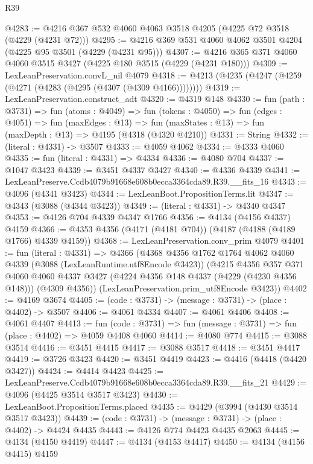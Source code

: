 \begin{lexlean}{R39}
\begin{coremodule}
@4283 := @4216 @367 @532 @4060 @4063 @3518 @4205 (@4225 @72 @3518 (@4229 (@4231 @72)))
@4295 := @4216 @369 @531 @4060 @4062 @3501 @4204 (@4225 @95 @3501 (@4229 (@4231 @95)))
@4307 := @4216 @365 @371 @4060 @4060 @3515 @3427 (@4225 @180 @3515 (@4229 (@4231 @180)))
@4309 := LexLeanPreservation.convL_nil @4079
@4318 := @4213 (@4235 (@4247 (@4259 (@4271 (@4283 (@4295 (@4307 (@4309 @4166))))))))
@4319 := LexLeanPreservation.construct_adt
@4320 := @4319 @148
@4330 := fun (path : @3731) =>
  fun (atoms : @4049) =>
  fun (tokens : @4050) =>
  fun (edges : @4051) =>
  fun (maxEdges : @13) =>
  fun (maxStates : @13) => fun (maxDepth : @13) => @4195 (@4318 (@4320 @4210))
@4331 := String
@4332 := (literal : @4331) -> @3507
@4333 := @4059 @4062
@4334 := @4333 @4060
@4335 := fun (literal : @4331) => @4334
@4336 := @4080 @704
@4337 := @1047 @3423
@4339 := @3451 @4337 @3427
@4340 := @4336 @4339
@4341 := LexLeanPreserve.Ccdb4079b91668e608b0ecca3364cda89.R39.__fits_16
@4343 := @4096 (@4341 @3423)
@4344 := LexLeanBoot.PropositionTerms.lit
@4347 := @4343 (@3088 (@4344 @3423))
@4349 := (literal : @4331) -> @4340 @4347
@4353 := @4126 @704 @4339 @4347 @1766
@4356 := @4134 (@4156 @4337) @4159
@4366 := @4353 @4356 (@4171 (@4181 @704)) (@4187 (@4188 (@4189 @1766) @4339 @4159))
@4368 := LexLeanPreservation.conv_prim @4079
@4401 := fun (literal : @4331) =>
  @4366
    (@4368
      @4356
      @1762
      @1764
      @4062
      @4060
      @4339
      (@3088 (LexLeanRuntime.utf8Encode @3423))
      (@4215
        @4356
        @357
        @371
        @4060
        @4060
        @4337
        @3427
        (@4224 @4356 @148 @4337 (@4229 (@4230 @4356 @148)))
        (@4309 @4356))
      (LexLeanPreservation.prim_utf8Encode @3423))
@4402 := @4169 @3674
@4405 := (code : @3731) -> (message : @3731) -> (place : @4402) -> @3507
@4406 := @4061 @4334
@4407 := @4061 @4406
@4408 := @4061 @4407
@4413 := fun (code : @3731) => fun (message : @3731) => fun (place : @4402) => @4059 @4408 @4060
@4414 := @4080 @774
@4415 := @3088 @3514
@4416 := @3451 @4415
@4417 := @3088 @3517
@4418 := @3451 @4417
@4419 := @3726 @3423
@4420 := @3451 @4419
@4423 := @4416 (@4418 (@4420 @3427))
@4424 := @4414 @4423
@4425 := LexLeanPreserve.Ccdb4079b91668e608b0ecca3364cda89.R39.__fits_21
@4429 := @4096 (@4425 @3514 @3517 @3423)
@4430 := LexLeanBoot.PropositionTerms.placed
@4435 := @4429 (@3994 (@4430 @3514 @3517 @3423))
@4439 := (code : @3731) -> (message : @3731) -> (place : @4402) -> @4424 @4435
@4443 := @4126 @774 @4423 @4435 @2063
@4445 := @4134 (@4150 @4419)
@4447 := @4134 (@4153 @4417)
@4450 := @4134 (@4156 @4415) @4159

\end{coremodule}
\end{lexlean}
